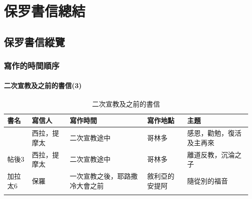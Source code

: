 

\chapter{保罗書信總結}
\section{保罗書信縱覽}


\subsection{寫作的時間順序}%

\subsubsection{二次宣教及之前的書信(3)}
\vspace*{-\baselineskip}
\def\rowi  {帖前5 & 西拉，提摩太&二次宣教途中&哥林多&感恩，勸勉，復活及主再來  \\}
\def\rowii {帖後3 & 西拉，提摩太 &二次宣教途中&哥林多&離道反教，沉淪之子\\}
\def\rowiii{加拉太6 & 保羅 &一次宣教之後，耶路撒冷大會之前&敘利亞的安提阿&隨從別的福音\\}
\begin{table}[!hbp]
\begin{tabular}{lllll}
\toprule
書名 & 寫信人 & 寫作時間&寫作地點&主題\\
\midrule
\sortfirstcol{\rowi\rowii\rowiii}
\bottomrule
\end{tabular}
\caption{二次宣教及之前的書信}
\end{table}

